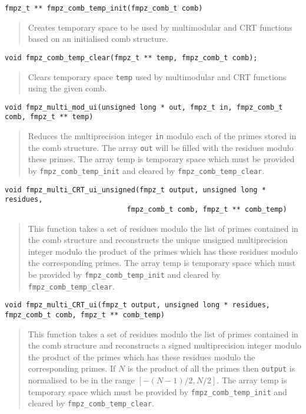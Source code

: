 \documentclass[a4paper,10pt]{article}
\newcommand{\code}{\lstinline}
\begin{document}
\begin{lstlisting}
fmpz_t ** fmpz_comb_temp_init(fmpz_comb_t comb)
\end{lstlisting}
\begin{quote}
Creates temporary space to be used by multimodular and CRT functions based on an initialised comb structure.
\end{quote}

\begin{lstlisting}
void fmpz_comb_temp_clear(fmpz_t ** temp, fmpz_comb_t comb);
\end{lstlisting}
\begin{quote}
Clears temporary space \code{temp} used by multimodular and CRT functions using the given comb.
\end{quote}

\begin{lstlisting}
void fmpz_multi_mod_ui(unsigned long * out, fmpz_t in, fmpz_comb_t comb, fmpz_t ** temp)
\end{lstlisting}
\begin{quote}
Reduces the multiprecision integer \code{in} modulo each of the primes stored in the comb structure. The array \code{out} will be filled with the residues modulo these primes. The array temp is temporary space which must be provided by \code{fmpz_comb_temp_init} and cleared by \code{fmpz_comb_temp_clear}.
\end{quote}

\begin{lstlisting}
void fmpz_multi_CRT_ui_unsigned(fmpz_t output, unsigned long * residues, 
                             fmpz_comb_t comb, fmpz_t ** comb_temp)
\end{lstlisting}
\begin{quote}
This function takes a set of residues modulo the list of primes contained in the comb structure and reconstructs the unique unsigned multiprecision integer modulo the product of the primes which has these residues modulo the corresponding primes. The array temp is temporary space which must be provided by \code{fmpz_comb_temp_init} and cleared by \code{fmpz_comb_temp_clear}. 
\end{quote}

\begin{lstlisting}
void fmpz_multi_CRT_ui(fmpz_t output, unsigned long * residues, fmpz_comb_t comb, fmpz_t ** comb_temp)
\end{lstlisting}
\begin{quote}
This function takes a set of residues modulo the list of primes contained in the comb structure and reconstructs a signed multiprecision integer modulo the product of the primes which has these residues modulo the corresponding primes. If $N$ is the product of all the primes then \code{output} is normalised to be in the range $[-(N-1)/2, N/2]$. The array temp is temporary space which must be provided by \code{fmpz_comb_temp_init} and cleared by \code{fmpz_comb_temp_clear}.
\end{quote}
\end{document}
